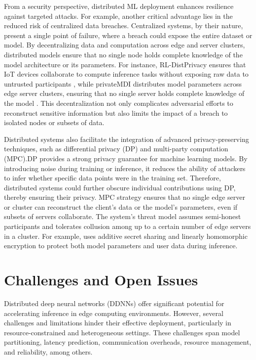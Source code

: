\documentclass[conference]{IEEEtran}
\begin{document}
From a security perspective, distributed ML deployment enhances resilience against targeted attacks. For example, another critical advantage lies in the reduced risk of centralized data breaches. Centralized systems, by their nature, present a single point of failure, where a breach could expose the entire dataset or model. By decentralizing data and computation across edge and server clusters, distributed models ensure that no single node holds complete knowledge of the model architecture or its parameters. For instance, RL-DistPrivacy ensures that IoT devices collaborate to compute inference tasks without exposing raw data to untrusted participants \cite{baccour2022rl}, while privateMDI distributes model parameters across edge server clusters, ensuring that no single server holds complete knowledge of the model \cite{dehkordi2024privacy}. This decentralization not only complicates adversarial efforts to reconstruct sensitive information but also limits the impact of a breach to isolated nodes or subsets of data.

Distributed systems also facilitate the integration of advanced privacy-preserving techniques, such as differential privacy (DP) and multi-party computation (MPC).DP provides a strong privacy guarantee for machine learning models. By introducing noise during training or inference, it reduces the ability of attackers to infer whether specific data points were in the training set. Therefore, distributed systems could further obscure individual contributions using DP, thereby ensuring their privacy. MPC strategy ensures that no single edge server or cluster can reconstruct the client’s data or the model's parameters, even if subsets of servers collaborate. The system’s threat model assumes semi-honest participants and tolerates collusion among up to a certain number of edge servers in a cluster. For example, \cite{dehkordi2024privacy} uses additive secret sharing and linearly homomorphic encryption to protect both model parameters and user data during inference. 





\section{Challenges and Open Issues}

Distributed deep neural networks (DDNNs) offer significant potential for accelerating inference in edge computing environments. However, several challenges and limitations hinder their effective deployment, particularly in resource-constrained and heterogeneous settings. These challenges span model partitioning, latency prediction, communication overheads, resource management, and reliability, among others.
\end{document}
